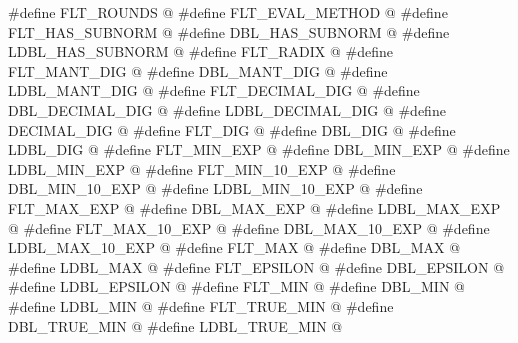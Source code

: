 %
%
%
%
%
%
%
%
%
%
%
%
%
%
%
%
%
%
%
%
%
%
%
%
%
%
%
%
%
%
%
%
%
%
%
%
%
%
%
%
%
\begin{codeblock}
#define FLT_ROUNDS @\seebelow@
#define FLT_EVAL_METHOD @\seebelow@
#define FLT_HAS_SUBNORM @\seebelow@
#define DBL_HAS_SUBNORM @\seebelow@
#define LDBL_HAS_SUBNORM @\seebelow@
#define FLT_RADIX @\seebelow@
#define FLT_MANT_DIG @\seebelow@
#define DBL_MANT_DIG @\seebelow@
#define LDBL_MANT_DIG @\seebelow@
#define FLT_DECIMAL_DIG @\seebelow@
#define DBL_DECIMAL_DIG @\seebelow@
#define LDBL_DECIMAL_DIG @\seebelow@
#define DECIMAL_DIG @\seebelow@
#define FLT_DIG @\seebelow@
#define DBL_DIG @\seebelow@
#define LDBL_DIG @\seebelow@
#define FLT_MIN_EXP @\seebelow@
#define DBL_MIN_EXP @\seebelow@
#define LDBL_MIN_EXP @\seebelow@
#define FLT_MIN_10_EXP @\seebelow@
#define DBL_MIN_10_EXP @\seebelow@
#define LDBL_MIN_10_EXP @\seebelow@
#define FLT_MAX_EXP @\seebelow@
#define DBL_MAX_EXP @\seebelow@
#define LDBL_MAX_EXP @\seebelow@
#define FLT_MAX_10_EXP @\seebelow@
#define DBL_MAX_10_EXP @\seebelow@
#define LDBL_MAX_10_EXP @\seebelow@
#define FLT_MAX @\seebelow@
#define DBL_MAX @\seebelow@
#define LDBL_MAX @\seebelow@
#define FLT_EPSILON @\seebelow@
#define DBL_EPSILON @\seebelow@
#define LDBL_EPSILON @\seebelow@
#define FLT_MIN @\seebelow@
#define DBL_MIN @\seebelow@
#define LDBL_MIN @\seebelow@
#define FLT_TRUE_MIN @\seebelow@
#define DBL_TRUE_MIN @\seebelow@
#define LDBL_TRUE_MIN @\seebelow@
\end{codeblock}


